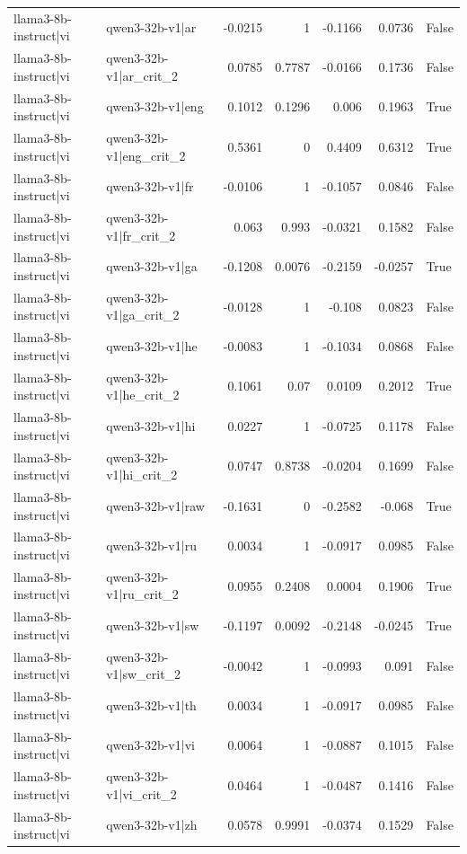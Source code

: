 \begin{table}
\begin{tabular}{l l r r r r l}
llama3-8b-instruct|vi & qwen3-32b-v1|ar & -0.0215 & 1 & -0.1166 & 0.0736 & False \\
llama3-8b-instruct|vi & qwen3-32b-v1|ar_crit_2 & 0.0785 & 0.7787 & -0.0166 & 0.1736 & False \\
llama3-8b-instruct|vi & qwen3-32b-v1|eng & 0.1012 & 0.1296 & 0.006 & 0.1963 & True \\
llama3-8b-instruct|vi & qwen3-32b-v1|eng_crit_2 & 0.5361 & 0 & 0.4409 & 0.6312 & True \\
llama3-8b-instruct|vi & qwen3-32b-v1|fr & -0.0106 & 1 & -0.1057 & 0.0846 & False \\
llama3-8b-instruct|vi & qwen3-32b-v1|fr_crit_2 & 0.063 & 0.993 & -0.0321 & 0.1582 & False \\
llama3-8b-instruct|vi & qwen3-32b-v1|ga & -0.1208 & 0.0076 & -0.2159 & -0.0257 & True \\
llama3-8b-instruct|vi & qwen3-32b-v1|ga_crit_2 & -0.0128 & 1 & -0.108 & 0.0823 & False \\
llama3-8b-instruct|vi & qwen3-32b-v1|he & -0.0083 & 1 & -0.1034 & 0.0868 & False \\
llama3-8b-instruct|vi & qwen3-32b-v1|he_crit_2 & 0.1061 & 0.07 & 0.0109 & 0.2012 & True \\
llama3-8b-instruct|vi & qwen3-32b-v1|hi & 0.0227 & 1 & -0.0725 & 0.1178 & False \\
llama3-8b-instruct|vi & qwen3-32b-v1|hi_crit_2 & 0.0747 & 0.8738 & -0.0204 & 0.1699 & False \\
llama3-8b-instruct|vi & qwen3-32b-v1|raw & -0.1631 & 0 & -0.2582 & -0.068 & True \\
llama3-8b-instruct|vi & qwen3-32b-v1|ru & 0.0034 & 1 & -0.0917 & 0.0985 & False \\
llama3-8b-instruct|vi & qwen3-32b-v1|ru_crit_2 & 0.0955 & 0.2408 & 0.0004 & 0.1906 & True \\
llama3-8b-instruct|vi & qwen3-32b-v1|sw & -0.1197 & 0.0092 & -0.2148 & -0.0245 & True \\
llama3-8b-instruct|vi & qwen3-32b-v1|sw_crit_2 & -0.0042 & 1 & -0.0993 & 0.091 & False \\
llama3-8b-instruct|vi & qwen3-32b-v1|th & 0.0034 & 1 & -0.0917 & 0.0985 & False \\
llama3-8b-instruct|vi & qwen3-32b-v1|vi & 0.0064 & 1 & -0.0887 & 0.1015 & False \\
llama3-8b-instruct|vi & qwen3-32b-v1|vi_crit_2 & 0.0464 & 1 & -0.0487 & 0.1416 & False \\
llama3-8b-instruct|vi & qwen3-32b-v1|zh & 0.0578 & 0.9991 & -0.0374 & 0.1529 & False \\

\end{tabular}
\end{table}

